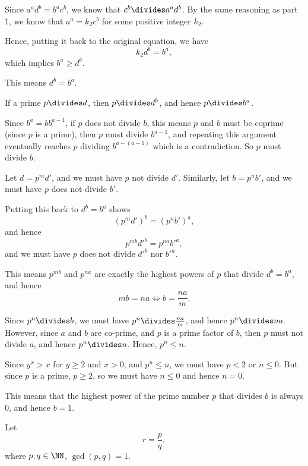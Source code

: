 \begin{enumerate}
          Since \(a^a d^b = b^a c^b\), we know that \(c^b \divides a^a d^b\). By the same reasoning as part 1, we know that \(a^a = k_2 c^b\) for some positive integer \(k_2\).

          Hence, putting it back to the original equation, we have
          \[
              k_2 d^b = b^a,
          \]
          which implies \(b^a \geq d^b\).

          This means \(d^b = b^a\).

          If a prime \(p \divides d\), then \(p \divides d^b\), and hence \(p \divides b^a\).

          Since \(b^a = b b^{a - 1}\), if \(p\) does not divide \(b\), this means \(p\) and \(b\) must be coprime (since \(p\) is a prime), then \(p\) must divide \(b^{a - 1}\), and repeating this argument eventually reaches \(p\) dividing \(b^{a - (a - 1)}\) which is a contradiction. So \(p\) must divide \(b\).

          Let \(d = p^m d'\), and we must have \(p\) not divide \(d'\). Similarly, let \(b = p^n b'\), and we must have \(p\) does not divide \(b'\).

          Putting this back to \(d^b = b^a\) shows
          \[
              (p^m d')^b = (p^n b')^a,
          \]
          and hence
          \[
              p^{mb} d'^b = p^{na} b'^a,
          \]
          and we must have \(p\) does not divide \(d'^b\) nor \(b'^a\).

          This means \(p^{mb}\) and \(p^{na}\) are exactly the highest powers of \(p\) that divide \(d^b = b^a\), and hence
          \[
              mb = na \iff b = \frac{na}{m}.
          \]

          Since \(p^n \divides b\), we must have \(p^n \divides \frac{na}{m}\), and hence \(p^n \divides na\). However, since \(a\) and \(b\) are co-prime, and \(p\) is a prime factor of \(b\), then \(p\) must not divide \(a\), and hence \(p^n \divides n\). Hence, \(p^n \leq n\).

          Since \(y^x > x\) for \(y \geq 2\) and \(x > 0\), and \(p^n \leq n\), we must have \(p < 2\) or \(n \leq 0\). But since \(p\) is a prime, \(p \geq 2\), so we must have \(n \leq 0\) and hence \(n = 0\).

          This means that the highest power of the prime number \(p\) that divides \(b\) is always \(0\), and hence \(b = 1\).

          Let
          \[
              r = \frac{p}{q},
          \]
          where \(p, q \in \NN\), \(\gcd(p, q) = 1\).


\end{enumerate}
